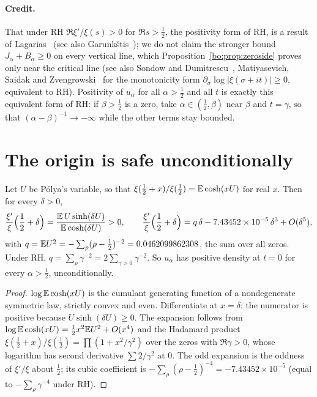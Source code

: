\paragraph{Credit.} That under RH $\Re\xi'/\xi(s)>0$ for $\Re s>\frac12$, the positivity form of RH, is a result of Lagarias~\cite{Lagarias} (see also Garunk\v{s}tis~\cite{Garunkstis02}); we do not claim the stronger bound $J_\alpha+B_\alpha\ge0$ on every vertical line, which Proposition~\ref{bo:prop:zeroside} proves only near the critical line (see also Sondow and Dumitrescu~\cite{SD10}, Matiyasevich, Saidak and Zvengrowski~\cite{MSZ14} for the monotonicity form $\partial_\sigma\log|\xi(\sigma+it)|\ge0$, equivalent to RH). %
Positivity of $u_\alpha$ for all $\alpha>\frac12$ and all $t$ is exactly this equivalent form of RH: if $\beta>\frac12$ is a zero, take $\alpha\in(\frac12,\beta)$ near $\beta$ and $t=\gamma$, so that $(\alpha-\beta)^{-1}\to-\infty$ while the other terms stay bounded.

\section{The origin is safe unconditionally}\label{bo:sec:origin}

\begin{proposition}\label{bo:prop:origin}
Let $U$ be P\'olya's variable, so that $\xi(\frac12+x)/\xi(\frac12)=\mathbb{E}\cosh(xU)$ for real $x$. Then for every $\delta>0$,
\[
\frac{\xi'}{\xi}\Bigl(\frac12+\delta\Bigr)=\frac{\mathbb{E}\,U\sinh(\delta U)}{\mathbb{E}\cosh(\delta U)}>0,\qquad \frac{\xi'}{\xi}\Bigl(\frac12+\delta\Bigr)=q\,\delta-7.43452\times10^{-5}\,\delta^3+O(\delta^5),
\]
with $q=\mathbb{E} U^2=-\sum_\rho(\rho-\frac12)^{-2}=0.0462099862308$, the sum over all zeros. Under RH, $q=\sum_\rho\gamma^{-2}=2\sum_{\gamma>0}\gamma^{-2}$. So $u_\alpha$ has positive density at $t=0$ for every $\alpha>\frac12$, unconditionally.
\end{proposition}

\begin{proof}
$\log\mathbb{E}\cosh(xU)$ is the cumulant generating function of a nondegenerate symmetric law, strictly convex and even. Differentiate at $x=\delta$: the numerator is positive because $U\sinh(\delta U)\ge0$. The expansion follows from $\log\mathbb{E}\cosh(xU)=\frac12x^2\mathbb{E} U^2+O(x^4)$ and the Hadamard product $\xi(\frac12+x)/\xi(\frac12)=\prod(1+x^2/\gamma^2)$ over the zeros with $\Re\gamma>0$, whose logarithm has second derivative $\sum2/\gamma^2$ at $0$. The odd expansion is the oddness of $\xi'/\xi$ about $\frac12$; its cubic coefficient is $-\sum_\rho(\rho-\frac12)^{-4}=-7.43452\times10^{-5}$ (equal to $-\sum_\rho\gamma^{-4}$ under RH).
\end{proof}

